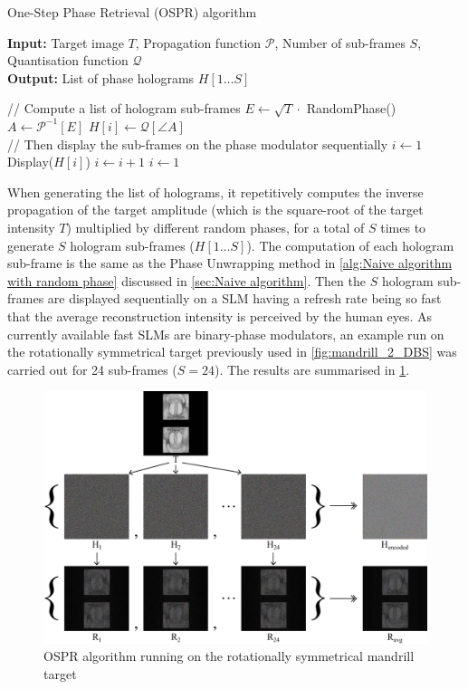 \begin{algorithm}[H]
  \caption{One-Step Phase Retrieval (OSPR) algorithm}\label{alg:One-Step Phase Retrieval (OSPR) algorithm}
  \textbf{Input:} Target image $T$, Propagation function $\mathcal{P}$, Number of sub-frames $S$, Quantisation function $\mathcal{Q}$\\
  \textbf{Output:} List of phase holograms $H[1\ldots S]$
  \begin{algorithmic}
    \State // Compute a list of hologram sub-frames
    \State $E \gets \sqrt{T} \cdot $ RandomPhase()
    \State $A \gets \mathcal{P}^{-1}[E]$
    \State $H[i] \gets \mathcal{Q}[\angle A]$
    \EndFor\\
    \State // Then display the sub-frames on the phase modulator sequentially
    \State $i\gets 1$
    \State Display($H[i]$)
    \State $i\gets i + 1$
    \State $i\gets 1$
    \EndIf
    \EndWhile
  \end{algorithmic}
\end{algorithm}

When generating the list of holograms, it repetitively computes the inverse propagation of the target amplitude (which is the square-root of the target intensity $T$) multiplied by different random phases, for a total of $S$ times to generate $S$ hologram sub-frames ($H[1\ldots S]$). The computation of each hologram sub-frame is the same as the Phase Unwrapping method in \cref{alg:Naive algorithm with random phase} discussed in \cref{sec:Naive algorithm}. Then the $S$ hologram sub-frames are displayed sequentially on a SLM having a refresh rate being so fast that the average reconstruction intensity is perceived by the human eyes. As currently available fast SLMs are binary-phase modulators, an example run on the rotationally symmetrical target previously used in \cref{fig:mandrill_2_DBS} was carried out for 24 sub-frames ($S=24$). The results are summarised in \cref{fig:ospr_mandrill_2}.

\begin{figure}[H]
	\centering
	\includegraphics[width=1.0\textwidth]{ospr_mandrill_2.pdf}
	\caption{OSPR algorithm running on the rotationally symmetrical mandrill target}
	\label{fig:ospr_mandrill_2}
\end{figure}

